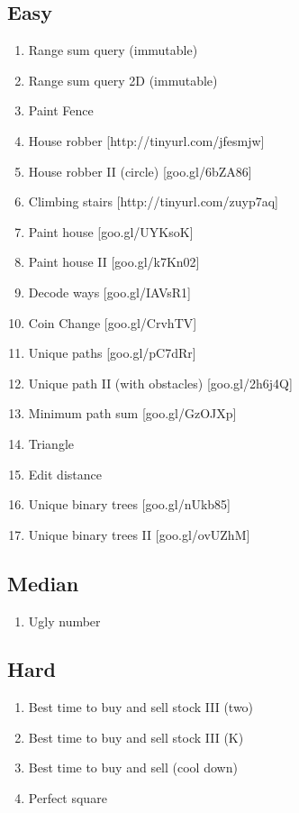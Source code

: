 \documentclass[DIV=calc, paper=a4, fontsize=11pt, twocolumn]{scrartcl}	 %
\begin{document}
\subsection*{Easy}
\begin{enumerate}
\item Range sum query (immutable) \cite{303}
\item Range sum query 2D (immutable) \cite{304}
\item Paint Fence \cite{276} 
\item House robber \cite{} [http://tinyurl.com/jfesmjw]
\item House robber II \cite{} (circle) [goo.gl/6bZA86]
\item Climbing stairs [http://tinyurl.com/zuyp7aq]
\item Paint house [goo.gl/UYKsoK]
\item Paint house II [goo.gl/k7Kn02]
\item Decode ways [goo.gl/IAVsR1]
\item Coin Change [goo.gl/CrvhTV]
\item Unique paths [goo.gl/pC7dRr]
\item Unique path II (with obstacles) [goo.gl/2h6j4Q]
\item Minimum path sum [goo.gl/GzOJXp]
\item Triangle
\item Edit distance
\item Unique binary trees [goo.gl/nUkb85]
\item Unique binary trees II [goo.gl/ovUZhM]
\end{enumerate}
\subsection*{Median} 
\begin{enumerate}
\item Ugly number
\end{enumerate}
\subsection*{Hard}
\begin{enumerate}
\item Best time to buy and sell stock III (two)
\item Best time to buy and sell stock III (K)
\item Best time to buy and sell (cool down)
\item Perfect square
\end{enumerate}
\end{document}
